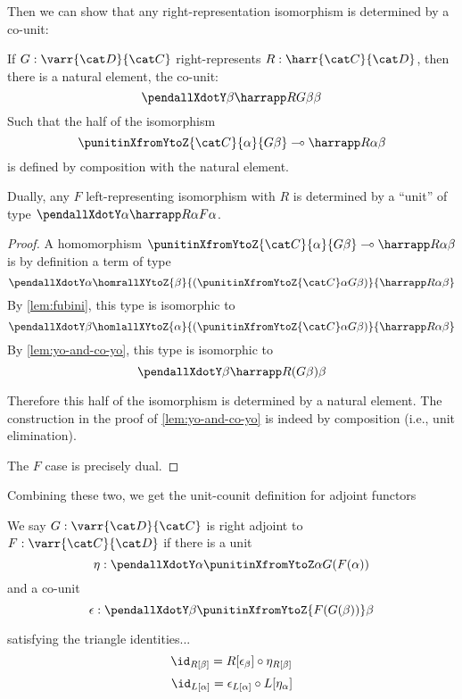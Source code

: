 Then we can show that any right-representation isomorphism is
determined by a co-unit:
\begin{lemma}
  If $G: \varr {\cat D}{\cat C}$ right-represents $R : \harr {\cat
    C}{\cat D}$, then there is a natural element, the co-unit:
  \[ \pendallXdotY \beta \harrapp R {G\beta} \beta \]
  Such that the half of the isomorphism 
  \[ \punitinXfromYtoZ {\cat C} {\alpha} {G \beta} \multimap \harrapp R {\alpha}{\beta} \]
  is defined by composition with the natural element.

  Dually, any $F$ left-representing isomorphism with $R$ is determined
  by a ``unit'' of type $\pendallXdotY \alpha \harrapp R {\alpha}
  {F\alpha}$.
\end{lemma}
\begin{proof}
  A homomorphism $\punitinXfromYtoZ {\cat C} {\alpha} {G \beta} \multimap \harrapp R {\alpha}{\beta}$ is by definition a term of type
  \[ \pendallXdotY \alpha \homrallXYtoZ {\beta} {(\punitinXfromYtoZ {\cat C} \alpha {G \beta})} {\harrapp R \alpha \beta} \]
  By \cref{lem:fubini}, this type is isomorphic to 
  \[ \pendallXdotY \beta \homlallXYtoZ {\alpha} {(\punitinXfromYtoZ {\cat C} \alpha {G \beta})} {\harrapp R \alpha \beta} \]
  By \cref{lem:yo-and-co-yo}, this type is isomorphic to
  \[ \pendallXdotY \beta {{\harrapp R {(G \beta)} \beta}} \]

  Therefore this half of the isomorphism is determined by a natural
  element. The construction in the proof of \cref{lem:yo-and-co-yo} is
  indeed by composition (i.e., unit elimination).

  The $F$ case is precisely dual.
\end{proof}

Combining these two, we get the unit-counit definition for adjoint
functors

\begin{definition}
  We say $G : \varr {\cat D}{\cat C}$ is right adjoint to $F : \varr
  {\cat C}{\cat D}$ if there is a unit
  \[ \eta : \pendallXdotY \alpha \punitinXfromYtoZ \alpha {G(F(\alpha))}\]
  and a co-unit
  \[ \epsilon : \pendallXdotY \beta \punitinXfromYtoZ {F(G(\beta))} \beta \]

  satisfying the triangle identities...
  \[ \id_{R[\beta]} = R[\epsilon_{\beta}] \circ \eta_{R[\beta]} \]
  \[ \id_{L[\alpha]} = \epsilon_{L[\alpha]} \circ L[\eta_{\alpha}] \]
\end{definition}


